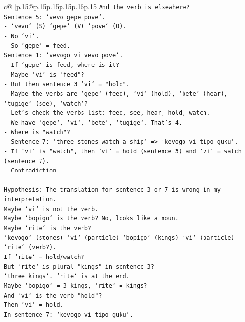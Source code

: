 \documentclass{article}
\begin{document}
{\begin{supertabular}{c@{$\;$}|p{.15\linewidth}@{}p{.15\linewidth}p{.15\linewidth}p{.15\linewidth}p{.15\linewidth}p{.15\linewidth}}
{{{\texttt{And the verb is elsewhere?} \\
\texttt{Sentence 5: `vevo gepe pove`.} \\
\texttt{{-} `vevo` (S) `gepe` (V) `pove` (O).} \\
\texttt{{-} No `vi`.} \\
\texttt{{-} So `gepe` = feed.} \\
\texttt{Sentence 1: `vevogo vi vevo pove`.} \\
\texttt{{-} If `gepe` is feed, where is it?} \\
\texttt{{-} Maybe `vi` is "feed"?} \\
\texttt{{-} But then sentence 3 `vi` = "hold".} \\
\texttt{{-} Maybe the verbs are `gepe` (feed), `vi` (hold), `bete` (hear), `tugige` (see), `watch`?} \\
\texttt{{-} Let's check the verbs list: feed, see, hear, hold, watch.} \\
\texttt{{-} We have `gepe`, `vi`, `bete`, `tugige`. That's 4.} \\
\texttt{{-} Where is "watch"?} \\
\texttt{{-} Sentence 7: `three stones watch a ship` => `kevogo vi tipo guku`.} \\
\texttt{{-} If `vi` is "watch", then `vi` = hold (sentence 3) and `vi` = watch (sentence 7).} \\
\texttt{{-} Contradiction.} \\
\\ 
\texttt{Hypothesis: The translation for sentence 3 or 7 is wrong in my interpretation.} \\
\texttt{Maybe `vi` is not the verb.} \\
\texttt{Maybe `bopigo` is the verb? No, looks like a noun.} \\
\texttt{Maybe `rite` is the verb?} \\
\texttt{`kevogo` (stones) `vi` (particle) `bopigo` (kings) `vi` (particle) `rite` (verb?).} \\
\texttt{If `rite` = hold/watch?} \\
\texttt{But `rite` is plural "kings" in sentence 3?} \\
\texttt{`three kings`. `rite` is at the end.} \\
\texttt{Maybe `bopigo` = 3 kings, `rite` = kings?} \\
\texttt{And `vi` is the verb "hold"?} \\
\texttt{Then `vi` = hold.} \\
\texttt{In sentence 7: `kevogo vi tipo guku`.} \\
}}}
\end{supertabular}}
\end{document}

